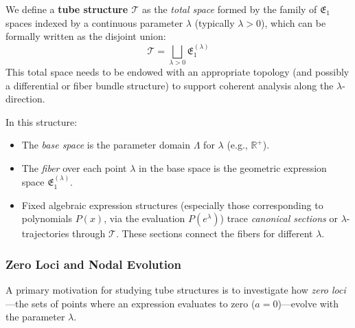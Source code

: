 We define a \textbf{tube structure $\mathcal{T}$} as the \emph{total space} formed by the family of $\mathfrak{E}_1$ spaces indexed by a continuous parameter $\lambda$ (typically $\lambda > 0$), which can be formally written as the disjoint union:
\begin{equation}
\mathcal{T} = \bigsqcup_{\lambda > 0} \mathfrak{E}_1^{(\lambda)}
\end{equation}
This total space needs to be endowed with an appropriate topology (and possibly a differential or fiber bundle structure) to support coherent analysis along the $\lambda$-direction.

In this structure:
\begin{itemize}
    \item The \emph{base space} is the parameter domain $\Lambda$ for $\lambda$ (e.g., $\mathbb{R}^+$).
    \item The \emph{fiber} over each point $\lambda$ in the base space is the geometric expression space $\mathfrak{E}_1^{(\lambda)}$.
    \item Fixed algebraic expression structures (especially those corresponding to polynomials $P(x)$, via the evaluation $P(e^\lambda)$) trace \emph{canonical sections} or $\lambda$-trajectories through $\mathcal{T}$. These sections connect the fibers for different $\lambda$.
\end{itemize}

\subsubsection{Zero Loci and Nodal Evolution}\label{subsec:tube_zeros}

A primary motivation for studying tube structures is to investigate how \emph{zero loci}—the sets of points where an expression evaluates to zero ($a=0$)—evolve with the parameter $\lambda$.

